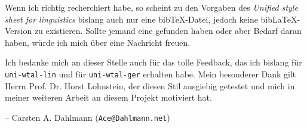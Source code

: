 \documentclass[12pt,notitlepage,parskip]{scrartcl}
\begin{document}
Wenn ich richtig recherchiert habe, so scheint zu den Vorgaben des
\textit{Unified style sheet for linguistics} bislang auch nur eine
bib\TeX-Datei, jedoch keine bib\LaTeX-Version zu existieren. Sollte jemand eine
gefunden haben oder aber Bedarf daran haben, würde ich mich über eine Nachricht
freuen.

Ich bedanke mich an dieser Stelle auch für das tolle Feedback, das ich bislang
für \texttt{uni-wtal-lin} und für \texttt{uni-wtal-ger} erhalten habe.
Mein besonderer Dank gilt Herrn Prof. Dr. Horst Lohnstein, der diesen Stil
ausgiebig getestet und mich in meiner weiteren Arbeit an diesem Projekt
motiviert hat.

– Carsten A. Dahlmann (\texttt{Ace@Dahlmann.net})

\newpage
\printbibliography[heading=style,keyword=style]
\printbibliography[heading=lin,keyword=lin]
\printbibliography[heading=weitere,keyword=weitere]
\nocite{*}
\end{document}
